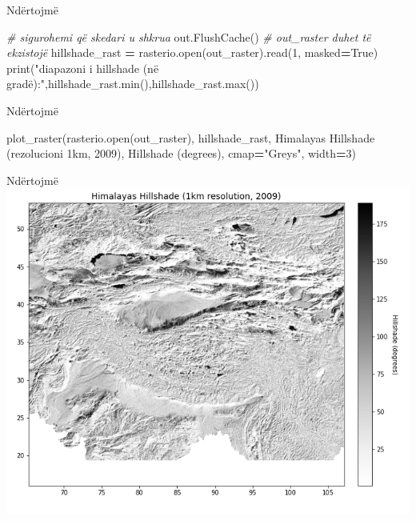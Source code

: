 \documentclass[
  ignorenonframetext,
]{beamer}
\newenvironment{Shaded}{\begin{snugshade}}{\end{snugshade}}
\newcommand{\BuiltInTok}[1]{#1}
\newcommand{\CommentTok}[1]{\textcolor[rgb]{0.56,0.35,0.01}{\textit{#1}}}
\newcommand{\DecValTok}[1]{\textcolor[rgb]{0.00,0.00,0.81}{#1}}
\newcommand{\NormalTok}[1]{#1}
\newcommand{\OperatorTok}[1]{\textcolor[rgb]{0.81,0.36,0.00}{\textbf{#1}}}
\newcommand{\StringTok}[1]{\textcolor[rgb]{0.31,0.60,0.02}{#1}}
\newcommand{\VariableTok}[1]{\textcolor[rgb]{0.00,0.00,0.00}{#1}}
\begin{document}
\begin{frame}[fragile]{Ndërtojmë}
\protect\hypertarget{nduxebrtojmuxeb-4}{}

\begin{Shaded}
\begin{Highlighting}[]
\CommentTok{\# sigurohemi që skedari u shkrua}
\NormalTok{out.FlushCache()}
\CommentTok{\# out\_raster duhet të ekzistojë}
\NormalTok{hillshade\_rast }\OperatorTok{=}\NormalTok{ rasterio.}\BuiltInTok{open}\NormalTok{(out\_raster).read(}\DecValTok{1}\NormalTok{, masked}\OperatorTok{=}\VariableTok{True}\NormalTok{)}
\BuiltInTok{print}\NormalTok{(}\StringTok{"diapazoni i hillshade (në gradë):"}\NormalTok{,hillshade\_rast.}\BuiltInTok{min}\NormalTok{(),hillshade\_rast.}\BuiltInTok{max}\NormalTok{())}
\end{Highlighting}
\end{Shaded}
\end{frame}

\begin{frame}[fragile]{Ndërtojmë}
\protect\hypertarget{nduxebrtojmuxeb-5}{}

\begin{Shaded}
\begin{Highlighting}[]
\NormalTok{plot\_raster(rasterio.}\BuiltInTok{open}\NormalTok{(out\_raster), hillshade\_rast, }
            \StringTok{\textquotesingle{}Himalayas Hillshade (rezolucioni 1km, 2009)\textquotesingle{}}\NormalTok{,}
            \StringTok{\textquotesingle{}Hillshade (degrees)\textquotesingle{}}\NormalTok{, cmap}\OperatorTok{=}\StringTok{"Greys"}\NormalTok{, width}\OperatorTok{=}\DecValTok{3}\NormalTok{)}
\end{Highlighting}
\end{Shaded}
\end{frame}

\begin{frame}{Ndërtojmë}
\protect\hypertarget{nduxebrtojmuxeb-6}{}
\includegraphics{./Figs/himal2.png}
\end{frame}
\end{document}
